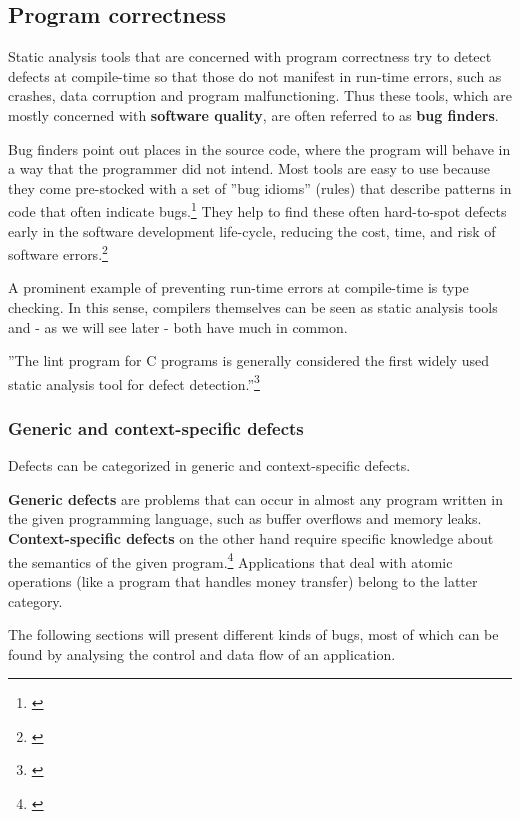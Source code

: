\subsection{Program correctness}

Static analysis tools that are concerned with program correctness try to detect defects at compile-time so that those do not manifest in run-time errors, such as crashes, data corruption and program malfunctioning. Thus these tools, which are mostly concerned with \textbf{software quality}, are often referred to as \textbf{bug finders}.

Bug finders point out places in the source code, where the program will behave in a way that the programmer did not intend. Most tools are easy to use because they come pre-stocked with a set of ''bug idioms'' (rules) that describe patterns in code that often indicate bugs.\footnote{\citep[32]{SecureProgramming}} They help to find these often hard-to-spot defects early in the software development life-cycle, reducing the cost, time, and risk of software errors.\footnote{\citep{CovertySA}}

A prominent example of preventing run-time errors at compile-time is type checking. In this sense, compilers themselves can be seen as static analysis tools and - as we will see later - both have much in common.

''The lint program for C programs is generally considered the first widely used static analysis tool for defect detection.''\footnote{\citep[1]{UsingSAToFindBugs}}

\subsubsection{Generic and context-specific defects}

Defects can be categorized in generic and context-specific defects.

\textbf{Generic defects} are problems that can occur in almost any program written in the given programming language, such as buffer overflows and memory leaks. \textbf{Context-specific defects} on the other hand require specific knowledge about the semantics of the given program.\footnote{\citep[14]{SecureProgramming}} Applications that deal with atomic operations (like a program that handles money transfer) belong to the latter category.

The following sections will present different kinds of bugs, most of which can be found by analysing the control and data flow of an application.

